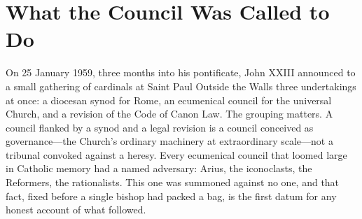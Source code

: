 \section{What the Council Was Called to Do}

On 25 January 1959, three months into his pontificate, John XXIII announced to a small gathering of cardinals at Saint Paul Outside the Walls three undertakings at once: a diocesan synod for Rome, an ecumenical council for the universal Church, and a revision of the Code of Canon Law. The grouping matters. A council flanked by a synod and a legal revision is a council conceived as governance---the Church's ordinary machinery at extraordinary scale---not a tribunal convoked against a heresy. Every ecumenical council that loomed large in Catholic memory had a named adversary: Arius, the iconoclasts, the Reformers, the rationalists. This one was summoned against no one, and that fact, fixed before a single bishop had packed a bag, is the first datum for any honest account of what followed.

